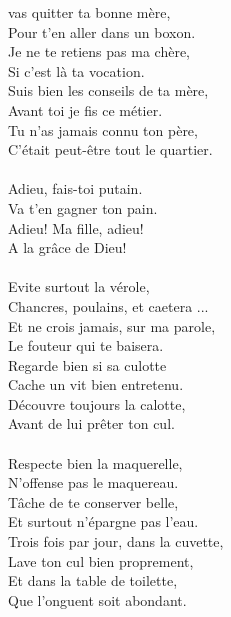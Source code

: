 
 vas quitter ta bonne mère, 
\\Pour t'en aller dans un boxon.
\\Je ne te retiens pas ma chère,
\\Si c'est là ta vocation.
\\Suis bien les conseils de ta mère, 
\\Avant toi je fis ce métier.
\\Tu n'as jamais connu ton père, 
\\C'était peut-être tout le quartier.
\\\\Adieu, fais-toi putain. 
\\Va t'en gagner ton pain. 
\\Adieu! Ma fille, adieu! 
\\A la grâce de Dieu!
\\\\Evite surtout la vérole,
\\Chancres, poulains, et caetera ... 
\\Et ne crois jamais, sur ma parole, 
\\Le fouteur qui te baisera. 
\\Regarde bien si sa culotte
\\Cache un vit bien entretenu. 
\\Découvre toujours la calotte, 
\\Avant de lui prêter ton cul.
\\\\Respecte bien la maquerelle, 
\\N'offense pas le maquereau.
\\Tâche de te conserver belle,
\\Et surtout n'épargne pas l'eau. 
\\Trois fois par jour, dans la cuvette, 
\\Lave ton cul bien proprement,
\\Et dans la table de toilette, 
\\Que l'onguent soit abondant.

\breakpage